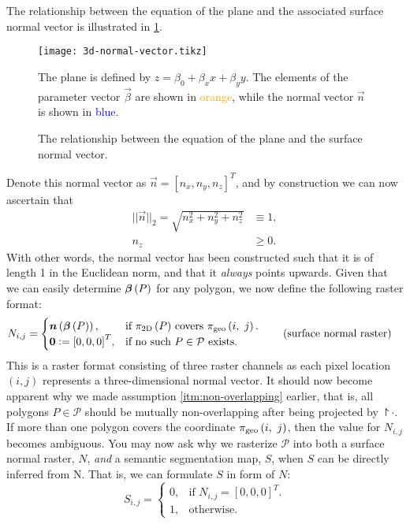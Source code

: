 The relationship between the equation of the plane and the associated surface normal vector is illustrated in \cref{fig:3d-normal-vector}.
\begin{figure}[H]
  \centering
  \texttt{[image: 3d-normal-vector.tikz]}
  \caption{%
    The relationship between the equation of the plane and the surface normal vector.
  }{%
    The plane is defined by $z = \beta_0 + \beta_x x + \beta_y y$.
    The elements of the parameter vector $\vec{\beta}$ are shown in \textcolor{orange}{orange}, while the normal vector $\vec{n}$ is shown in \textcolor{blue}{blue}.
  }%
  \label{fig:3d-normal-vector}
\end{figure}
\noindent
Denote this normal vector as $\vec{n} = {[n_x, n_y, n_z]}^T$, and by construction we can now ascertain that
\begin{align*}
  ||\vec{n}||_2 = \sqrt{n_x^2 + n_y^2 + n_z^2} &\equiv 1,
  \\
  n_z &\geq 0.
\end{align*}
With other words, the normal vector has been constructed such that it is of length 1 in the Euclidean norm, and that it \emph{always} points upwards.
\noindent
Given that we can easily determine $\boldsymbol{\beta}\left(P\right)$ for any polygon, we now define the following raster format:
\begin{align*}
  N_{i,j} &= \begin{cases}
    \boldsymbol{n}\left(\boldsymbol{\beta}\left(P\right)\right), &\text{if $\pi_{\mathrm{2D}}\left(P\right)$ covers } \pi_{\mathrm{geo}}\left(i,~j\right).\\
    \boldsymbol{0} \vcentcolon= {[0, 0, 0]}^T, &\text{if no such } P \in \mathcal{P} \text{ exists.}
  \end{cases}
  \tag{surface normal raster}
\end{align*}
This is a raster format consisting of three raster channels as each pixel location $(i, j)$ represents a three-dimensional normal vector.
It should now become apparent why we made assumption \ref{itm:non-overlapping} earlier, that is, all polygons $P \in \mathcal{P}$ should be mutually non-overlapping after being projected by $\project{\cdot}$.
If more than one polygon covers the coordinate $\pi_{\mathrm{geo}}\left(i,~j\right)$, then the value for $N_{i,j}$ becomes ambiguous.
You may now ask why we rasterize $\mathcal{P}$ into both a surface normal raster, $N$, \emph{and} a semantic segmentation map, $S$, when $S$ can be directly inferred from N.
That is, we can formulate $S$ in form of $N$:
\begin{equation*}
  S_{i, j}
  =
  \begin{cases}
    0, &\text{if } N_{i,j} = {\left[0, 0, 0\right]}^T.  \\
    1, &\text{otherwise.}
  \end{cases}
\end{equation*}
